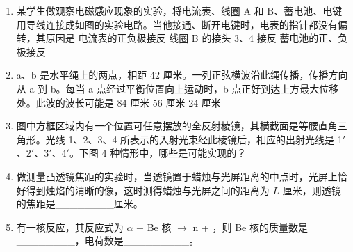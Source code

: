 \documentclass[\gkver]{gaokaozhenti}
\begin{document}
\begin{enumerate}
\item
某学生做观察电磁感应现象的实验，将电流表、线圈 A 和 B、蓄电池、电键用导线连接成如图的实验电路。当他接通、断开电键时，电表的指针都没有偏转，其原因是
{电流表的正负极接反}
{线圈 B 的接头 3、4 接反}
{蓄电池的正、负极接反}

\item
a、b 是水平绳上的两点，相距 42 厘米。一列正弦横波沿此绳传播，传播方向从 a 到 b。每当 a 点经过平衡位置向上运动时，b 点正好到达上方最大位移处。此波的波长可能是
{84 厘米}
{56 厘米}
{24 厘米}

\item
图中方框区域内有一个位置可任意摆放的全反射棱镜，其横截面是等腰直角三角形。光线 1、2、3、4 所表示的入射光束经此棱镜后，相应的出射光线是 1$'$、2$'$、3$'$、4$'$。下图 4 种情形中，哪些是可能实现的？

\item
做测量凸透镜焦距的实验时，当透镜置于蜡烛与光屏距离的中点时，光屏上恰好得到烛焰的清晰的像，这时测得蜡烛与光屏之间的距离为 $L$ 厘米，则透镜的焦距是\_\_\_\_\_\_\_\_厘米。

\item
有一核反应，其反应式为 $\alpha$ + Be 核 $\to$ n + ，则 Be 核的质量数是\_\_\_\_\_\_\_\_，电荷数是\_\_\_\_\_\_\_\_\_。


\end{enumerate}
\end{document}
